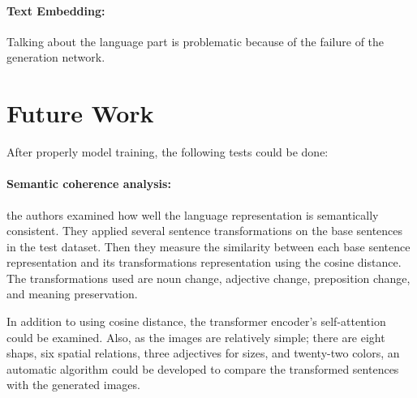\documentclass[11pt,a4paper]{article}
\begin{document}
\paragraph{Text Embedding:} Talking about the language part is problematic because of the failure of the generation network.

\section{Future Work}

After properly model training, the following tests could be done:

\paragraph{Semantic coherence analysis:} the authors examined how well the language representation is semantically consistent. They applied several sentence transformations on the base sentences in the test dataset. Then they measure the similarity between each base sentence representation and its transformations representation using the cosine distance. The transformations used are noun change, adjective change, preposition change, and meaning preservation. 

In addition to using cosine distance, the transformer encoder's self-attention could be examined. Also, as the images are relatively simple; there are eight shaps, six spatial relations, three adjectives for sizes, and twenty-two  colors, an automatic algorithm could be developed to compare the transformed sentences with the generated images.

\newpage


\end{document}
